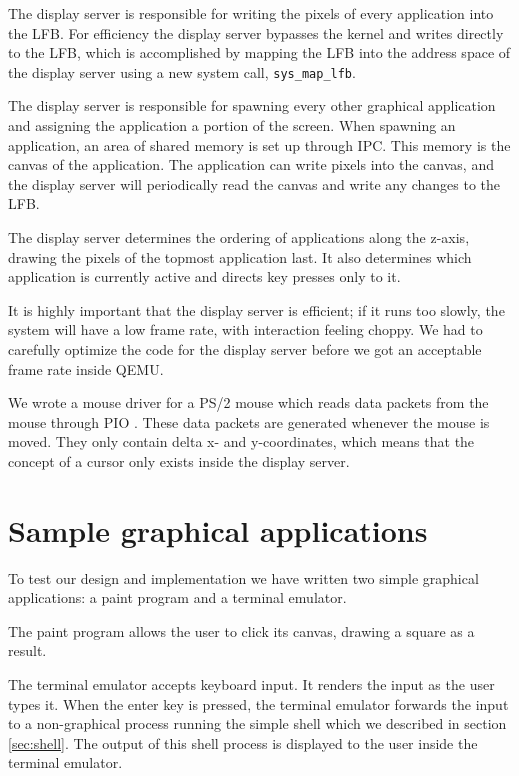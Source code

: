 \documentclass{report}
\begin{document}
The display server is responsible for writing the pixels of every application
into the LFB. For efficiency the display server bypasses the kernel and writes
directly to the LFB, which is accomplished by mapping the LFB into the address
space of the display server using a new system call, \texttt{sys\_map\_lfb}.

The display server is responsible for spawning every other graphical
application and assigning the application a portion of the screen. When
spawning an application, an area of shared memory is set up through IPC.
This memory is the canvas of the application. The application can write pixels
into the canvas, and the display server will periodically read the canvas and
write any changes to the LFB. 

The display server determines the ordering of applications along the z-axis,
drawing the pixels of the topmost application last. It also determines which
application is currently active and directs key presses only to it.

It is highly important that the display server is efficient; if it runs too
slowly, the system will have a low frame rate, with interaction feeling
choppy. We had to carefully optimize the code for the display server before we
got an acceptable frame rate inside QEMU.

We wrote a mouse driver for a PS/2 mouse which reads data packets from the
mouse through PIO \cite{mouseinput}. These data packets are generated whenever
the mouse is moved. They only contain delta x- and y-coordinates, which means
that the concept of a cursor only exists inside the display server.


\section{Sample graphical applications}
To test our design and implementation we have written two simple graphical
applications: a paint program and a terminal emulator. 

The paint program allows the user to click its canvas, drawing a square as a
result.

The terminal emulator accepts keyboard input. It renders the input as the user
types it. When the enter key is pressed, the terminal emulator forwards the
input to a non-graphical process running the simple shell which we described
in section \ref{sec:shell}. The output of this shell process is displayed to
the user inside the terminal emulator.
\end{document}
